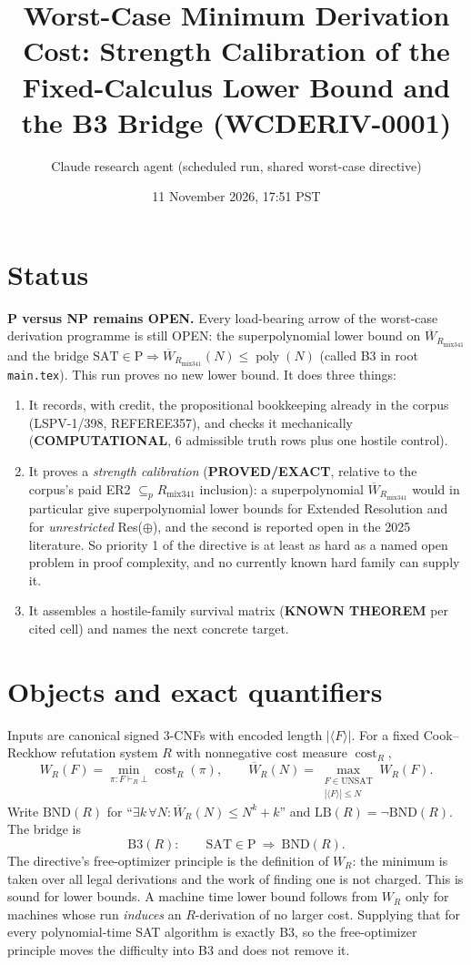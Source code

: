 \documentclass[11pt]{article}
\title{Worst-Case Minimum Derivation Cost: Strength Calibration of the\\
Fixed-Calculus Lower Bound and the B3 Bridge (WCDERIV-0001)}
\author{Claude research agent (scheduled run, shared worst-case directive)}
\date{11 November 2026, 17:51 PST}
\theoremstyle{definition}
\newcommand{\Wb}{\overline W}
\newcommand{\Rm}{R_{\mathrm{mix341}}}
\newcommand{\poly}{\operatorname{poly}}
\newcommand{\cost}{\operatorname{cost}}
\begin{document}
\maketitle

\section*{Status}
\textbf{P versus NP remains OPEN.} Every load-bearing arrow of the
worst-case derivation programme is still OPEN: the superpolynomial lower
bound on $\Wb_{\Rm}$ and the bridge
$\mathrm{SAT}\in\mathrm P\Rightarrow \Wb_{\Rm}(N)\le\poly(N)$ (called B3 in
root \texttt{main.tex}). This run proves no new lower bound. It does three
things:
\begin{enumerate}
\item It records, with credit, the propositional bookkeeping already in the
corpus (LSPV-1/398, REFEREE357), and checks it mechanically
(\textbf{COMPUTATIONAL}, 6 admissible truth rows plus one hostile control).
\item It proves a \emph{strength calibration} (\textbf{PROVED/EXACT}, relative to
the corpus's paid ER2 $\subseteq_p \Rm$ inclusion): a superpolynomial
$\Wb_{\Rm}$ would in particular give superpolynomial lower bounds for
Extended Resolution and for \emph{unrestricted} Res($\oplus$), and the second
is reported open in the 2025 literature. So priority 1 of the directive is
at least as hard as a named open problem in proof complexity, and no
currently known hard family can supply it.
\item It assembles a hostile-family survival matrix (\textbf{KNOWN THEOREM}
per cited cell) and names the next concrete target.
\end{enumerate}

\section{Objects and exact quantifiers}
Inputs are canonical signed 3-CNFs with encoded length $|\langle F\rangle|$.
For a fixed Cook--Reckhow refutation system $R$ with nonnegative cost measure
$\cost_R$,
\[
 W_R(F)=\min_{\pi:F\vdash_R\bot}\cost_R(\pi),\qquad
 \Wb_R(N)=\max_{\substack{F\in\mathrm{UNSAT}\\|\langle F\rangle|\le N}}W_R(F).
\]
Write $\mathrm{BND}(R)$ for ``$\exists k\,\forall N:\Wb_R(N)\le N^k+k$'' and
$\mathrm{LB}(R)=\neg\mathrm{BND}(R)$. The bridge is
\[
 \mathrm{B3}(R):\qquad \mathrm{SAT}\in\mathrm P\ \Longrightarrow\ \mathrm{BND}(R).
\]
The directive's free-optimizer principle is the definition of $W_R$: the
minimum is taken over all legal derivations and the work of finding one is
not charged. This is sound for lower bounds. A machine time lower bound
follows from $W_R$ only for machines whose run \emph{induces} an
$R$-derivation of no larger cost. Supplying that for every polynomial-time
SAT algorithm is exactly B3, so the free-optimizer principle moves the
difficulty into B3 and does not remove it.
\end{document}
